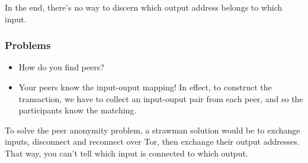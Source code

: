 \documentclass[12pt]{article}
\begin{document}
In the end, there's no way to discern which output address belongs to which input.

\subsubsection*{Problems}

\begin{itemize}
\item How do you find peers?
\item Your peers know the input-ouput mapping! In effect, to construct the transaction, we have to collect an input-ouput pair from each peer, and so the participants know the matching.
\end{itemize}

To solve the peer anonymity problem, a strawman solution would be to exchange inputs, disconnect and reconnect over Tor, then exchange their output addresses. That way, you can't tell which input is connected to which output.
\end{document}
